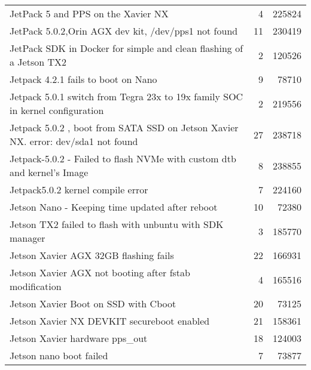 \begin{longtable}{p{}rr}
    JetPack 5 and PPS on the Xavier NX                                                                  & 4        & 225824 \\
    JetPack 5.0.2,Orin AGX dev kit, /dev/pps1 not found                                                 & 11       & 230419 \\
    JetPack SDK in Docker for simple and clean flashing of a Jetson TX2                                 & 2        & 120526 \\
    Jetpack 4.2.1 fails to boot on Nano                                                                 & 9        & 78710  \\
    Jetpack 5.0.1 switch from Tegra 23x to 19x family SOC in kernel configuration                       & 2        & 219556 \\
    Jetpack 5.0.2 , boot from SATA SSD on Jetson Xavier NX. error: dev/sda1 not found                   & 27       & 238718 \\
    Jetpack-5.0.2 - Failed to flash NVMe with custom dtb and kernel’s Image                             & 8        & 238855 \\
    Jetpack5.0.2 kernel compile error                                                                   & 7        & 224160 \\
    Jetson Nano - Keeping time updated after reboot                                                     & 10       & 72380  \\
    Jetson TX2 failed to flash with unbuntu with SDK manager                                            & 3        & 185770 \\
    Jetson Xavier AGX 32GB flashing fails                                                               & 22       & 166931 \\
    Jetson Xavier AGX not booting after fstab modification                                              & 4        & 165516 \\
    Jetson Xavier Boot on SSD with Cboot                                                                & 20       & 73125  \\
    Jetson Xavier NX DEVKIT secureboot enabled                                                          & 21       & 158361 \\
    Jetson Xavier hardware pps\_out                                                                     & 18       & 124003 \\
    Jetson nano boot failed                                                                             & 7        & 73877  \\

\end{longtable}
